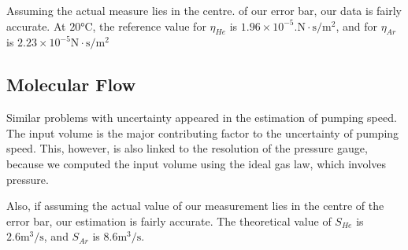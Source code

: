 \documentclass[12pt,a4paper]{article}
\begin{document}
	Assuming the actual measure lies in the centre. of our error bar, our data is fairly accurate. At $20\si{\celsius}$, the reference value for $\eta_{He}$ is $1.96 \times 10^{-5}. \si{\newton\cdot\second\per\metre^2}$, and for $\eta_{Ar}$ is $2.23 \times 10^{-5} \si{\newton\cdot\second\per\metre^2}$ 
	
	\subsection{Molecular Flow}
	Similar problems with uncertainty appeared in the estimation of pumping speed. The input volume is the major contributing factor to the uncertainty of pumping speed. This, however, is also linked to the resolution of the pressure gauge, because we computed the input volume using the ideal gas law, which involves pressure.	
	
	Also, if assuming the actual value of our measurement lies in the centre of the error bar, our estimation is fairly accurate. The theoretical value of $S_{He}$ is $2.6\si{\meter^3\per\second}$, and $S_{Ar}$ is $8.6\si{\meter^3\per\second}$.\cite{Viscosity}
	 
	
	
	
\end{document}
